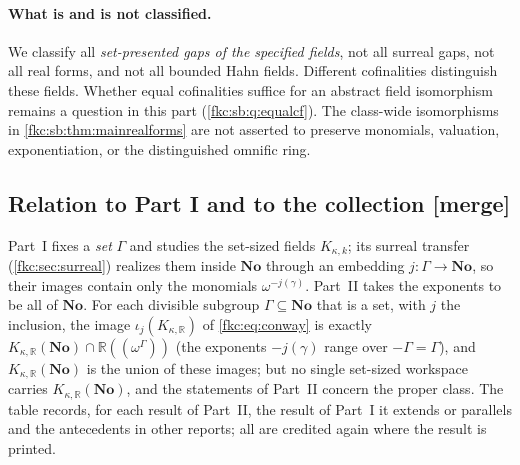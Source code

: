 \documentclass[11pt,letterpaper]{article}
\numberwithin{equation}{section}
\theoremstyle{definition}
\theoremstyle{remark}
\newcommand{\R}{\mathbb R}
\newcommand{\No}{\mathbf{No}}
\newcommand{\K}{K_{\kappa,k}}
\newcommand{\mergetag}{\textup{\textsf{\small[merge]}}}%
\newcommand{\KN}[2]{K_{#1,#2}(\No)}%
\begin{document}
\paragraph{What is and is not classified.}
We classify all \emph{set-presented gaps of the specified fields}, not all surreal gaps, not all real forms, and not all bounded Hahn fields. Different cofinalities distinguish these fields. Whether equal cofinalities suffice for an abstract field isomorphism remains a question in this part (\cref{fkc:sb:q:equalcf}). The class-wide isomorphisms in \cref{fkc:sb:thm:mainrealforms} are not asserted to preserve monomials, valuation, exponentiation, or the distinguished omnific ring.

\subsection{Relation to Part I and to the collection \mergetag}
\label{fkc:sb:sub:relation}

Part~I fixes a \emph{set} $\Gamma$ and studies the set-sized fields $\K$; its surreal transfer (\cref{fkc:sec:surreal}) realizes them inside $\No$ through an embedding $j:\Gamma\to\No$, so their images contain only the monomials $\omega^{-j(\gamma)}$. Part~II takes the exponents to be all of $\No$. For each divisible subgroup $\Gamma\subseteq\No$ that is a set, with $j$ the inclusion, the image $\iota_j(K_{\kappa,\R})$ of \eqref{fkc:eq:conway} is exactly $\KN\kappa\R\cap\R((\omega^{\Gamma}))$ (the exponents $-j(\gamma)$ range over $-\Gamma=\Gamma$), and $\KN\kappa\R$ is the union of these images; but no single set-sized workspace carries $\KN\kappa\R$, and the statements of Part~II concern the proper class. The table records, for each result of Part~II, the result of Part~I it extends or parallels and the antecedents in other reports; all are credited again where the result is printed.
\end{document}
